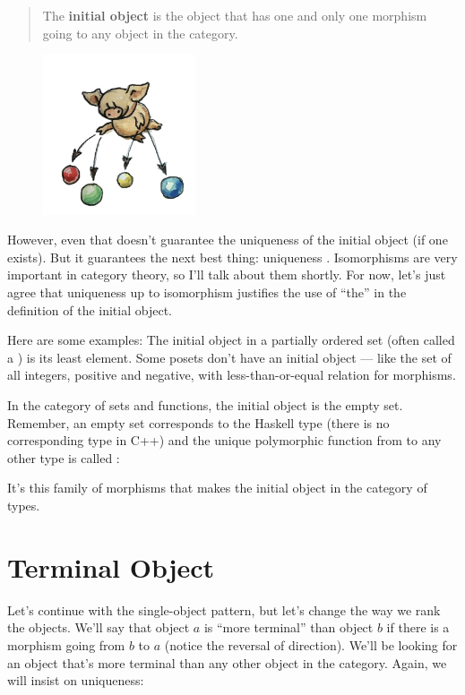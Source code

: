 \begin{quote}
The \textbf{initial object} is the object that has one and only one
morphism going to any object in the category.
\end{quote}

\begin{figure}[H]
\centering
\includegraphics[width=0.4\textwidth]{images/initial.jpg}
\end{figure}

\noindent
However, even that doesn't guarantee the uniqueness of the initial
object (if one exists). But it guarantees the next best thing:
uniqueness . Isomorphisms are very important in
category theory, so I'll talk about them shortly. For now, let's just
agree that uniqueness up to isomorphism justifies the use of ``the'' in
the definition of the initial object.

Here are some examples: The initial object in a partially ordered set
(often called a ) is its least element. Some posets don't
have an initial object --- like the set of all integers, positive and
negative, with less-than-or-equal relation for morphisms.

In the category of sets and functions, the initial object is the empty
set. Remember, an empty set corresponds to the Haskell type
 (there is no corresponding type in C++) and the unique
polymorphic function from  to any other type is called
:

It's this family of morphisms that makes  the initial
object in the category of types.

\section{Terminal Object}

Let's continue with the single-object pattern, but let's change the way
we rank the objects. We'll say that object $a$ is ``more terminal''
than object $b$ if there is a morphism going from $b$ to
$a$ (notice the reversal of direction). We'll be looking for an
object that's more terminal than any other object in the category.
Again, we will insist on uniqueness:

